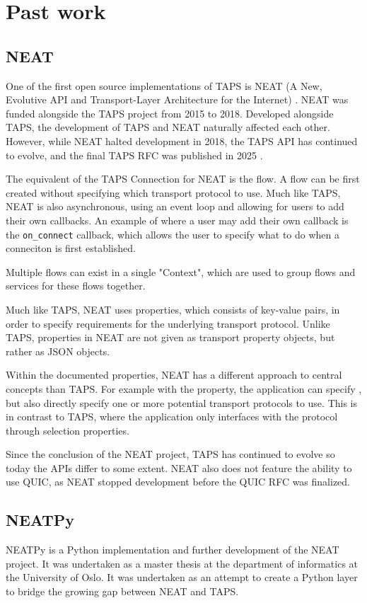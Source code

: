 \chapter{Past work}

\section{NEAT}
One of the first open source implementations of TAPS is 
NEAT (A New, Evolutive API and Transport-Layer Architecture for the Internet) 
\cite{khademiNEATPlatformProtocolIndependent2017}. NEAT was funded alongside the 
TAPS project from 2015 to 2018.
Developed alongside TAPS, the development of TAPS and NEAT naturally
affected each other. However, while NEAT halted development in 2018,
the TAPS API has continued to evolve, and the final TAPS RFC was published
in 2025 \cite{trammellAbstractApplicationProgramming2025}.

The equivalent of the TAPS Connection for NEAT is the flow. A flow can
be first created without specifying
which transport protocol to use. Much like TAPS, NEAT is also asynchronous,
using an event loop and allowing for users to add their own callbacks.
An example of where a user may add their own callback is the
\texttt{on\_connect} callback, which allows the user to specify
what to do when a conneciton is first established.

Multiple flows can exist in a single "Context", which are used
to group flows and services for these flows together.

Much like TAPS, NEAT uses properties, which consists of key-value pairs,
in order to specify requirements for the underlying transport protocol.
Unlike TAPS, properties in NEAT are not given as transport property
objects, but rather as JSON objects. 

Within the documented properties, NEAT has a different approach
to central concepts than TAPS. For example with the  property,
the application can specify , but also directly
specify one or more potential transport protocols to use. This
is in contrast to TAPS, where the application only interfaces
with the protocol through selection properties.

Since the conclusion of the NEAT project, TAPS has continued to evolve
so today the APIs differ to some extent. NEAT also does not feature
the ability to use QUIC, as NEAT stopped development before the QUIC
RFC was finalized.

\section{NEATPy}
NEATPy \cite{gundersenNEATPyStandardsConformantProtocolIndependent2020}
is a Python implementation and further development of the NEAT project.
It was undertaken as a master thesis at the department of informatics
at the University of Oslo. It was undertaken as an attempt to create a
Python layer to bridge the growing gap between NEAT and TAPS.

